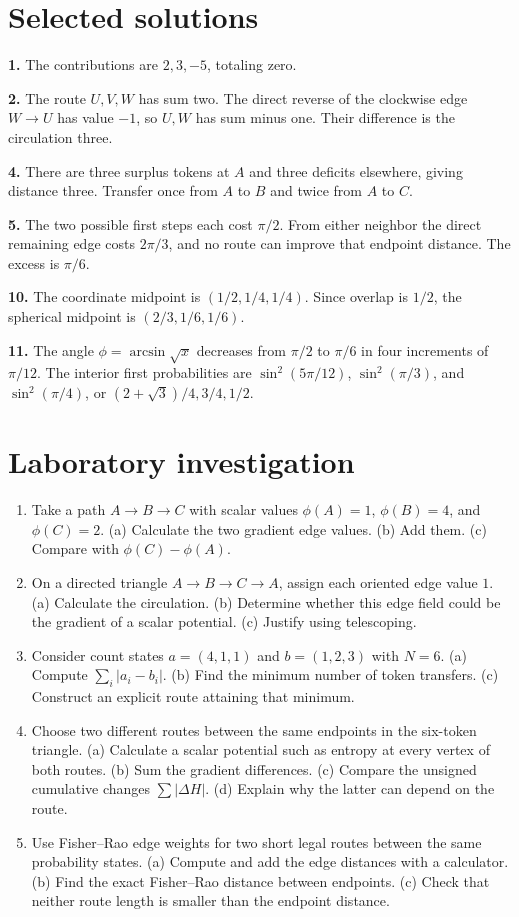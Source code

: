 \documentclass[11pt,oneside,openany]{book}
\theoremstyle{definition}
\theoremstyle{remark}
\numberwithin{equation}{chapter}
\providecommand{\tightlist}{\setlength{\itemsep}{0pt}\setlength{\parskip}{0pt}}
\newcommand{\labheading}{\FloatBarrier\section*{Laboratory investigation}\addcontentsline{toc}{section}{Laboratory investigation}}
\begin{document}
\section{Selected solutions}\label{ch08-selected-solutions}

\textbf{1.} The contributions are \(2,3,-5\), totaling zero.

\textbf{2.} The route \(U,V,W\) has sum two. The direct reverse of the clockwise edge \(W\to U\) has value \(-1\), so \(U,W\) has sum minus one. Their difference is the circulation three.

\textbf{4.} There are three surplus tokens at \(A\) and three deficits elsewhere, giving distance three. Transfer once from \(A\) to \(B\) and twice from \(A\) to \(C\).

\textbf{5.} The two possible first steps each cost \(\pi/2\). From either neighbor the direct remaining edge costs \(2\pi/3\), and no route can improve that endpoint distance. The excess is \(\pi/6\).

\textbf{10.} The coordinate midpoint is \((1/2,1/4,1/4)\). Since overlap is \(1/2\), the spherical midpoint is \((2/3,1/6,1/6)\).

\textbf{11.} The angle \(\phi=\arcsin\sqrt{x}\) decreases from \(\pi/2\) to \(\pi/6\) in four increments of \(\pi/12\). The interior first probabilities are \(\sin^2(5\pi/12)\), \(\sin^2(\pi/3)\), and \(\sin^2(\pi/4)\), or \((2+\sqrt3)/4,3/4,1/2\).
\labheading\begin{enumerate}
\def\labelenumi{\arabic{enumi}.}
\tightlist
\item
  Take a path \(A\to B\to C\) with scalar values \(\phi(A)=1\), \(\phi(B)=4\), and \(\phi(C)=2\). (a) Calculate the two gradient edge values. (b) Add them. (c) Compare with \(\phi(C)-\phi(A)\).
\item
  On a directed triangle \(A\to B\to C\to A\), assign each oriented edge value \(1\). (a) Calculate the circulation. (b) Determine whether this edge field could be the gradient of a scalar potential. (c) Justify using telescoping.
\item
  Consider count states \(a=(4,1,1)\) and \(b=(1,2,3)\) with \(N=6\). (a) Compute \(\sum_i|a_i-b_i|\). (b) Find the minimum number of token transfers. (c) Construct an explicit route attaining that minimum.
\item
  Choose two different routes between the same endpoints in the six-token triangle. (a) Calculate a scalar potential such as entropy at every vertex of both routes. (b) Sum the gradient differences. (c) Compare the unsigned cumulative changes \(\sum|\Delta H|\). (d) Explain why the latter can depend on the route.
\item
  Use Fisher--Rao edge weights for two short legal routes between the same probability states. (a) Compute and add the edge distances with a calculator. (b) Find the exact Fisher--Rao distance between endpoints. (c) Check that neither route length is smaller than the endpoint distance.
\end{enumerate}
\end{document}
